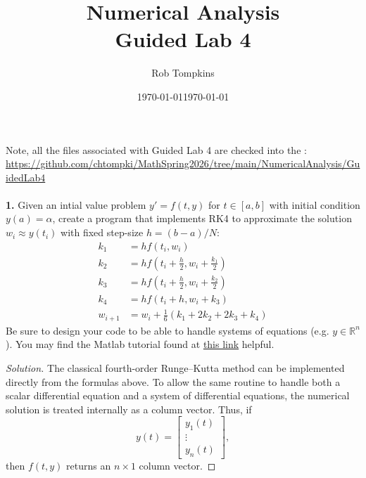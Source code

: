\documentclass[12pt]{amsart}
\title{Numerical Analysis\\Guided Lab 4}
\author{Rob Tompkins}
\date{\today}
\newenvironment{solution}
{\begin{proof}[Solution]}
{\end{proof}}
\begin{document}
    \maketitle
    \date{\today}
    \begin{onehalfspace}
        Note, all the files associated with Guided Lab 4 are checked into the : \\
        \underline{https://github.com/chtompki/MathSpring2026/tree/main/NumericalAnalysis/GuidedLab4}\\
\quad\\

        \noindent\textbf{1.} Given an intial value problem $y'=f(t,y)$ for $t\in[a,b]$ with initial condition $y(a)=\alpha$,
        create a program that implements RK4 to approximate the solution $w_i\approx y(t_i)$ with
        fixed step-size $h=(b-a)/N$:
        \begin{align*}
            k_1 &= h f(t_i,w_i)\\
            k_2 &= h f\left(t_i+\frac h2,w_i+\frac{k_1}{2}\right)\\
            k_3 &= h f\left(t_i+\frac h2,w_i+\frac{k_2}{2}\right)\\
            k_4 &= h f(t_i+h,w_i+k_3)\\
            w_{i+1} &= w_i+\frac16(k_1+2k_2+2k_3+k_4)
        \end{align*}
        \vspace{7pt}
        Be sure to design your code to be able to handle systems of equations (e.g. $y\in\mathbb R^n$).
        You may find the Matlab tutorial found at \href{https://ocw.mit.edu/courses/res-18-009-learn-differential-equations-up-close-with-gilbert-strang-and-cleve-moler-fall-2015/resources/classical-runge-kutta-ode4/}{this link} helpful.

        \begin{solution}
            The classical fourth-order Runge--Kutta method can be implemented directly
            from the formulas above. To allow the same routine to handle both a scalar
            differential equation and a system of differential equations, the numerical
            solution is treated internally as a column vector. Thus, if
            \[
                y(t)=
                \begin{bmatrix}
                    y_1(t)\\
                    \vdots\\
                    y_n(t)
                \end{bmatrix},
            \]
            then \(f(t,y)\) returns an \(n\times1\) column vector.


\end{solution}
\end{onehalfspace}
\end{document}
